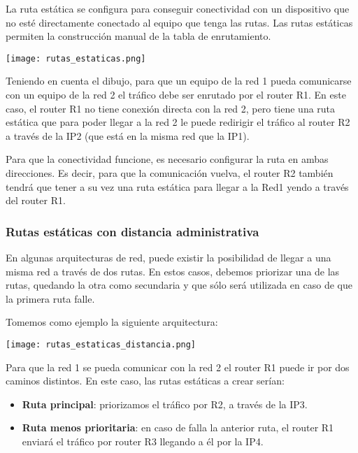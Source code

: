 La ruta estática se configura para conseguir conectividad con un dispositivo que no esté directamente conectado al equipo que tenga las rutas. Las rutas estáticas permiten la construcción manual de la tabla de enrutamiento.

\begin{center}
    \vspace{-15pt}
    \texttt{[image: rutas\_estaticas.png]}
    \vspace{-25pt}
\end{center}

Teniendo en cuenta el dibujo, para que un equipo de la red 1 pueda comunicarse con un equipo de la red 2 el tráfico debe ser enrutado por el router R1. En este caso, el router R1 no tiene conexión directa con la red 2, pero tiene una ruta estática que para poder llegar a la red 2 le puede redirigir el tráfico al router R2 a través de la IP2 (que está en la misma red que la IP1).

Para que la conectividad funcione, es necesario configurar la ruta en ambas direcciones. Es decir, para que la comunicación vuelva, el router R2 también tendrá que tener a su vez una ruta estática para llegar a la Red1 yendo a través del router R1.



\subsubsection{Rutas estáticas con distancia administrativa}
En algunas arquitecturas de red, puede existir la posibilidad de llegar a una misma red a través de dos rutas. En estos casos, debemos priorizar una de las rutas, quedando la otra como secundaria y que sólo será utilizada en caso de que la primera ruta falle.

Tomemos como ejemplo la siguiente arquitectura:

\begin{center}
    \vspace{-15pt}
    \texttt{[image: rutas\_estaticas\_distancia.png]}
    \vspace{-25pt}
\end{center}

Para que la red 1 se pueda comunicar con la red 2 el router R1 puede ir por dos caminos distintos. En este caso, las rutas estáticas a crear serían:
\begin{itemize}
    \item \textbf{Ruta principal}: priorizamos el tráfico por R2, a través de la IP3.
    \item \textbf{Ruta menos prioritaria}: en caso de falla la anterior ruta, el router R1 enviará el tráfico por router R3 llegando a él por la IP4.
\end{itemize}

